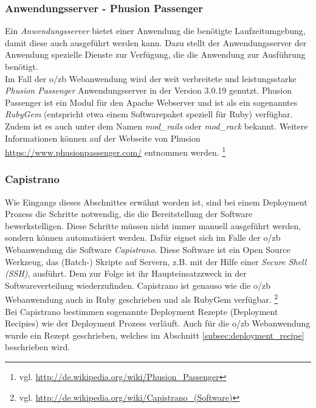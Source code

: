 \documentclass[12pt,             %
               a4paper,          %
               listof=totoc,     %
               index=totoc,      %
               bibliography=totoc,%
               oneside,         %
               BCOR1cm,          %
               english   %
               ]{scrbook}
\begin{document}
\subsubsection{Anwendungsserver - Phusion Passenger}
Ein \textit{Anwendungsserver} bietet einer Anwendung die benötigte Laufzeitumgebung, damit diese auch ausgeführt werden kann. Dazu stellt der Anwendungsserver der Anwendung spezielle Dienste zur Verfügung, die die Anwendung zur Ausführung benötigt.\\
Im Fall der o/zb Webanwendung wird der weit verbreitete und leistungsstarke \textit{Phusion Passenger} Anwendungsserver in der Version 3.0.19 genutzt. Phusion Passenger ist ein Modul für den Apache Webserver und ist als ein sogenanntes \textit{RubyGem} (entspricht etwa einem Softwarepaket speziell für Ruby) verfügbar. Zudem ist es auch unter dem Namen \textit{mod\_rails} oder \textit{mod\_rack} bekannt. Weitere Informationen können auf der Webseite von Phusion \url{https://www.phusionpassenger.com/} entnommen werden. \footnote{vgl. \url{http://de.wikipedia.org/wiki/Phusion_Passenger}}

\subsubsection{Capistrano}
Wie Eingangs dieses Abschnittes erwähnt worden ist, sind bei einem Deployment Prozess die Schritte notwendig, die die Bereitstellung der Software bewerkstelligen. Diese Schritte müssen nicht immer manuell ausgeführt werden, sondern können automatisiert werden. Dafür eignet sich im Falle der o/zb Webanwendung die Software \textit{Capistrano}. Diese Software ist ein Open Source Werkzeug, das (Batch-) Skripte auf Servern, z.B. mit der Hilfe einer \textit{Secure Shell (SSH)}, ausführt. Dem zur Folge ist ihr Haupteinsatzzweck in der Softwareverteilung wiederzufinden. Capistrano ist genauso wie die o/zb Webanwendung auch in Ruby geschrieben und als RubyGem verfügbar. \footnote{vgl. \url{http://de.wikipedia.org/wiki/Capistrano_(Software)}}\\

Bei Capistrano bestimmen sogenannte Deployment Rezepte (\glqq Deployment Recipies\grqq) wie der Deployment Prozess verläuft. Auch für die o/zb Webanwendung wurde ein Rezept geschrieben, welches im Abschnitt \vref{subsec:deployment_recipe} beschrieben wird.
\end{document}
